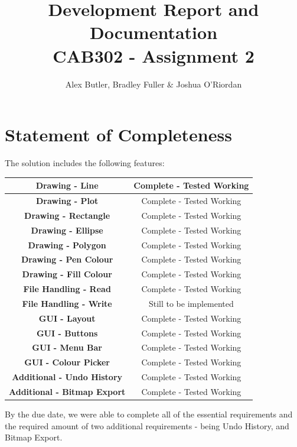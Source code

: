 \documentclass[12pt]{article} %
\begin{document}

\title{Development Report and Documentation
		 \\ \large CAB302 - Assignment 2}

\author {Alex Butler,  Bradley Fuller \& Joshua O'Riordan}
\maketitle

\newpage

\tableofcontents

\newpage

\section{Statement of Completeness}

The solution includes the following features: 
\begin{center}
	\begin{tabular}{|c|c|}
		\hline  \textbf{Drawing - Line} & Complete - Tested Working \\
		\hline  \textbf{Drawing - Plot} & Complete - Tested Working \\
		\hline  \textbf{Drawing - Rectangle} & Complete - Tested Working \\
		\hline  \textbf{Drawing - Ellipse} & Complete - Tested Working \\
		\hline  \textbf{Drawing - Polygon} & Complete - Tested Working \\
		\hline  \textbf{Drawing - Pen Colour} & Complete - Tested Working \\
		\hline  \textbf{Drawing - Fill Colour} & Complete - Tested Working \\
		\hline  \textbf{File Handling - Read} & Complete - Tested Working \\
		\hline  \textbf{File Handling - Write} & Still to be implemented \\
		\hline  \textbf{GUI - Layout} & Complete - Tested Working \\
		\hline  \textbf{GUI - Buttons} & Complete - Tested Working \\
		\hline  \textbf{GUI - Menu Bar} & Complete - Tested Working \\
		\hline  \textbf{GUI - Colour Picker} & Complete - Tested Working \\
		\hline  \textbf{Additional - Undo History} & Complete - Tested Working \\
		\hline  \textbf{Additional - Bitmap Export} & Complete - Tested Working \\
		\hline
	\end{tabular}
\end{center}
By the due date, we were able to complete all of the essential requirements and the required amount of two additional requirements - being Undo History, and Bitmap Export. 
\end{document}
